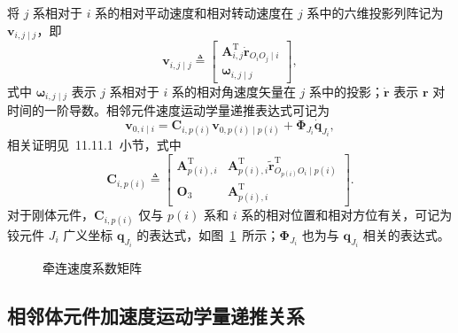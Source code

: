 将 $j$ 系相对于 $i$ 系的相对平动速度和相对转动速度在 $j$ 系中的六维投影列阵记为 $\boldsymbol{v}_{i,j \mid j}$，即
\begin{equation}\label{eq:10.5}
  \boldsymbol{v}_{i,j \mid j} \triangleq \begin{bmatrix} \boldsymbol{A}_{i,j}^{\mathrm{T}} \dot{\boldsymbol{r}}_{O_i O_j \mid i} \\ \boldsymbol{\omega}_{i,j \mid j} \end{bmatrix},
\end{equation}
式中 $\boldsymbol{\omega}_{i,j \mid j}$ 表示 $j$ 系相对于 $i$ 系的相对角速度矢量在 $j$ 系中的投影；$\dot{\boldsymbol{r}}$ 表示 $\boldsymbol{r}$ 对时间的一阶导数。相邻元件速度运动学量递推表达式可记为
\begin{equation}\label{eq:10.6}
  \boldsymbol{v}_{0,i \mid i} = \boldsymbol{C}_{i,p(i)} \boldsymbol{v}_{0,p(i) \mid p(i)} + \boldsymbol{\Phi}_{J_i} \dot{\boldsymbol{q}}_{J_i},
\end{equation}
相关证明见~11.11.1~小节，式中
\begin{equation}\label{eq:10.7}
  \boldsymbol{C}_{i,p(i)} \triangleq \begin{bmatrix}
    \boldsymbol{A}_{p(i),i}^{\mathrm{T}} & \boldsymbol{A}_{p(i),i}^{\mathrm{T}} \tilde{\boldsymbol{r}}_{O_{p(i)} O_i \mid p(i)}^{\mathrm{T}} \\
    \boldsymbol{O}_3 & \boldsymbol{A}_{p(i),i}^{\mathrm{T}}
  \end{bmatrix}.
\end{equation}
对于刚体元件，$\boldsymbol{C}_{i,p(i)}$ 仅与 $p(i)$ 系和 $i$ 系的相对位置和相对方位有关，可记为铰元件 $J_i$ 广义坐标 $\boldsymbol{q}_{J_i}$ 的表达式，如图~\ref{fig:10.5}~所示；$\boldsymbol{\Phi}_{J_i}$ 也为与 $\boldsymbol{q}_{J_i}$ 相关的表达式。

\begin{figure}[htbp]
  \centering
  \caption{牵连速度系数矩阵}
  \label{fig:10.5}
\end{figure}

\subsection{相邻体元件加速度运动学量递推关系}

